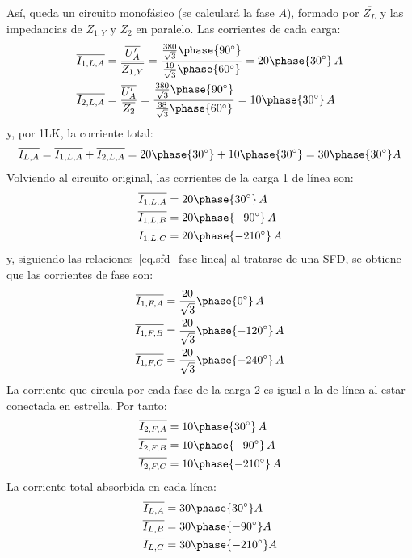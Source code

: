 \documentclass[11pt]{book} %
\begin{document}
\begin{example}
		Así, queda un circuito monofásico (se calculará la fase $A$), formado por $\overline{Z_L}$ y las impedancias de $\overline{Z_{1,Y}}$ y $\overline{Z_2}$ en paralelo. Las corrientes de cada carga:
		\begin{align*}
		    \overline{I_{1,L,A}}&=\dfrac{\overline{U_A'}}{\overline{Z_{1,Y}}}=\dfrac{\frac{380}{\sqrt{3}}\phase{90^\circ}}{\frac{19}{\sqrt{3}}\phase{60^\circ}}=20\phase{30^\circ}\,A\\
		    \overline{I_{2,L,A}}&=\dfrac{\overline{U_A'}}{\overline{Z_{2}}}=\dfrac{\frac{380}{\sqrt{3}}\phase{90^\circ}}{\frac{38}{\sqrt{3}}\phase{60^\circ}}=10\phase{30^\circ}\,A
		\end{align*}
		y, por 1LK, la corriente total:
		\begin{equation*}
		    \overline{I_{L,A}}=\overline{I_{1,L,A}}+\overline{I_{2,L,A}}=20\phase{30^\circ}+10\phase{30^\circ}=30\phase{30^\circ} A
		\end{equation*}
		Volviendo al circuito original, las corrientes de la carga 1 de línea son:
		\begin{align*}
		    \overline{I_{1,L,A}}&=20\phase{30^\circ}\,A\\
		    \overline{I_{1,L,B}}&=20\phase{-90^\circ}\,A\\
		    \overline{I_{1,L,C}}&=20\phase{-210^\circ}\,A\\
		\end{align*}
		y, siguiendo las relaciones~\eqref{eq.sfd_fase-linea} al tratarse de una SFD, se obtiene que las corrientes de fase son: 
		\begin{align*}
		    \overline{I_{1,F,A}}&=\dfrac{20}{\sqrt{3}}\phase{0^\circ}\,A\\
		    \overline{I_{1,F,B}}&=\dfrac{20}{\sqrt{3}}\phase{-120^\circ}\,A\\
		    \overline{I_{1,F,C}}&=\dfrac{20}{\sqrt{3}}\phase{-240^\circ}\,A\\
		\end{align*}
		La corriente que circula por cada fase de la carga 2 es igual a la de línea al estar conectada en estrella. Por tanto:
		\begin{align*}
		    \overline{I_{2,F,A}}&=10\phase{30^\circ}\,A\\
		    \overline{I_{2,F,B}}&=10\phase{-90^\circ}\,A\\
		    \overline{I_{2,F,C}}&=10\phase{-210^\circ}\,A
		\end{align*}
		La corriente total absorbida en cada línea:
		\begin{align*}
		    \overline{I_{L,A}}&=30\phase{30^\circ} A\\
		    \overline{I_{L,B}}&=30\phase{-90^\circ} A\\
		    \overline{I_{L,C}}&=30\phase{-210^\circ} A\\
		\end{align*}
		

\end{example}
\end{document}
